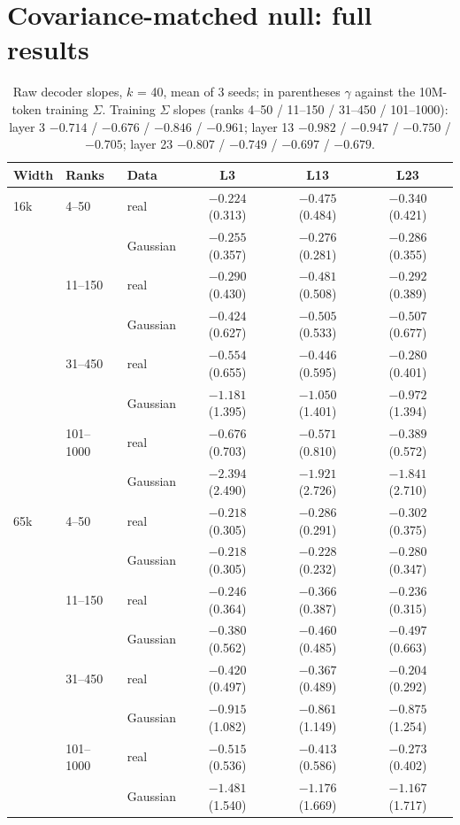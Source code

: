 \documentclass[10pt,twocolumn]{article}
\newcommand{\gam}{\gamma}
\begin{document}
\section{Covariance-matched null: full results}
\label{app:null}

\begin{table}[h]
\centering
\small
\caption{Raw decoder slopes, $k$ = 40, mean of 3 seeds; in parentheses $\gam$ against the 10M-token training $\Sigma$. Training $\Sigma$ slopes (ranks 4--50 / 11--150 / 31--450 / 101--1000): layer 3 $-0.714$ / $-0.676$ / $-0.846$ / $-0.961$; layer 13 $-0.982$ / $-0.947$ / $-0.750$ / $-0.705$; layer 23 $-0.807$ / $-0.749$ / $-0.697$ / $-0.679$.}
\label{tab:nullfull}
\begin{tabular}{lllccc}
\toprule
Width & Ranks & Data & L3 & L13 & L23 \\
\midrule
16k & 4--50 & real & $-0.224$ (0.313) & $-0.475$ (0.484) & $-0.340$ (0.421) \\
 & & Gaussian & $-0.255$ (0.357) & $-0.276$ (0.281) & $-0.286$ (0.355) \\
 & 11--150 & real & $-0.290$ (0.430) & $-0.481$ (0.508) & $-0.292$ (0.389) \\
 & & Gaussian & $-0.424$ (0.627) & $-0.505$ (0.533) & $-0.507$ (0.677) \\
 & 31--450 & real & $-0.554$ (0.655) & $-0.446$ (0.595) & $-0.280$ (0.401) \\
 & & Gaussian & $-1.181$ (1.395) & $-1.050$ (1.401) & $-0.972$ (1.394) \\
 & 101--1000 & real & $-0.676$ (0.703) & $-0.571$ (0.810) & $-0.389$ (0.572) \\
 & & Gaussian & $-2.394$ (2.490) & $-1.921$ (2.726) & $-1.841$ (2.710) \\
65k & 4--50 & real & $-0.218$ (0.305) & $-0.286$ (0.291) & $-0.302$ (0.375) \\
 & & Gaussian & $-0.218$ (0.305) & $-0.228$ (0.232) & $-0.280$ (0.347) \\
 & 11--150 & real & $-0.246$ (0.364) & $-0.366$ (0.387) & $-0.236$ (0.315) \\
 & & Gaussian & $-0.380$ (0.562) & $-0.460$ (0.485) & $-0.497$ (0.663) \\
 & 31--450 & real & $-0.420$ (0.497) & $-0.367$ (0.489) & $-0.204$ (0.292) \\
 & & Gaussian & $-0.915$ (1.082) & $-0.861$ (1.149) & $-0.875$ (1.254) \\
 & 101--1000 & real & $-0.515$ (0.536) & $-0.413$ (0.586) & $-0.273$ (0.402) \\
 & & Gaussian & $-1.481$ (1.540) & $-1.176$ (1.669) & $-1.167$ (1.717) \\
\bottomrule
\end{tabular}
\end{table}
\end{document}
